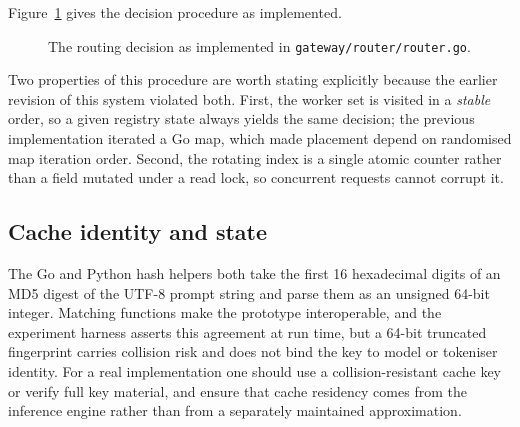 \documentclass[10pt,twocolumn]{article}
\begin{document}
Figure~\ref{fig:policy} gives the decision procedure as implemented.

\begin{figure}[t]
\centering
{}
\caption{The routing decision as implemented in \texttt{gateway/\allowbreak router/\allowbreak router.go}.}
\label{fig:policy}
\end{figure}

Two properties of this procedure are worth stating explicitly because the
earlier revision of this system violated both. First, the worker set is
visited in a \emph{stable} order, so a given registry state always yields the
same decision; the previous implementation iterated a Go map, which made
placement depend on randomised map iteration order. Second, the rotating index
is a single atomic counter rather than a field mutated under a read lock, so
concurrent requests cannot corrupt it.

\subsection{Cache identity and state}

The Go and Python hash helpers both take the first 16 hexadecimal digits of an
MD5 digest of the UTF-8 prompt string and parse them as an unsigned 64-bit
integer. Matching functions make the prototype interoperable, and the
experiment harness asserts this agreement at run time, but a 64-bit truncated
fingerprint carries collision risk and does not bind the key to model or
tokeniser identity. For a real implementation one should use a
collision-resistant cache key or verify full key material, and ensure that
cache residency comes from the inference engine rather than from a separately
maintained approximation.
\end{document}
